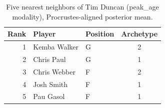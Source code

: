 \begin{table}[htbp]
  \centering\small
  \begin{tabular}{rllc}
    \toprule
    Rank & Player & Position & Archetype \\
    \midrule
    1 & Kemba Walker & G & 2 \\
    2 & Chris Paul & G & 1 \\
    3 & Chris Webber & F & 2 \\
    4 & Josh Smith & F & 1 \\
    5 & Pau Gasol & F & 1 \\
    \bottomrule
  \end{tabular}
  \caption{Five nearest neighbors of Tim Duncan (peak_age modality), Procrustes-aligned posterior mean.}
  \label{tab:Tim_Duncan_neighbors_peak_age}
\end{table}

